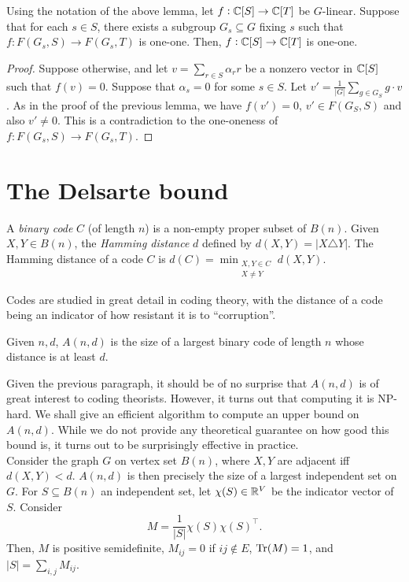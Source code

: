 	\begin{fcor}
		\label{cor:glinear-11}
		Using the notation of the above lemma, let $f : \mathbb{C}[S] \to \mathbb{C}[T]$ be $G$-linear. Suppose that for each $s \in S$, there exists a subgroup $G_s \subseteq G$ fixing $s$ such that $f : F(G_s,S) \to F(G_s,T)$ is one-one. Then, $f : \mathbb{C}[S] \to \mathbb{C}[T]$ is one-one.
	\end{fcor}
	\begin{proof}
		Suppose otherwise, and let $v = \sum_{r \in S} \alpha_r r$ be a nonzero vector in $\mathbb{C}[S]$ such that $f(v) = 0$. Suppose that $\alpha_s = 0$ for some $s \in S$. Let $v' = \frac{1}{|G|} \sum_{g \in G_S} g \cdot v$. As in the proof of the previous lemma, we have $f(v') = 0$, $v' \in F(G_S,S)$ and also $v' \ne 0$. This is a contradiction to the one-oneness of $f : F(G_s,S) \to F(G_s,T)$.
	\end{proof}

\section{The Delsarte bound}
\label{subsec:delsarte}

	\begin{fdef}
		A \emph{binary code} $C$ (of length $n$) is a non-empty proper subset of $B(n)$. Given $X,Y \in B(n)$, the \emph{Hamming distance} $d$ defined by $d(X,Y) = |X \triangle Y|$. The Hamming distance of a code $C$ is $d(C) = \min_{\substack{X,Y \in C \\ X \ne Y}} d(X,Y)$.
	\end{fdef}

	Codes are studied in great detail in coding theory, with the distance of a code being an indicator of how resistant it is to ``corruption''.

	\begin{fdef}
		Given $n,d$, $A(n,d)$ is the size of a largest binary code of length $n$ whose distance is at least $d$.
	\end{fdef}

	Given the previous paragraph, it should be of no surprise that $A(n,d)$ is of great interest to coding theorists. However, it turns out that computing it is \textsf{NP}-hard. We shall give an efficient algorithm to compute an upper bound on $A(n,d)$. While we do not provide any theoretical guarantee on how good this bound is, it turns out to be surprisingly effective in practice.\\

	Consider the graph $G$ on vertex set $B(n)$, where $X,Y$ are adjacent iff $d(X,Y) < d$. $A(n,d)$ is then precisely the size of a largest independent set on $G$. For $S \subseteq B(n)$ an independent set, let $\chi(S) \in \mathbb{R}^V$ be the indicator vector of $S$. Consider
	\[ M = \frac{1}{|S|} \chi(S) \chi(S)^\top. \]
	Then, $M$ is positive semidefinite, $M_{ij} = 0$ if $ij \not\in E$, $\operatorname{Tr}(M) = 1$, and $|S| = \sum_{i,j} M_{ij}$.

